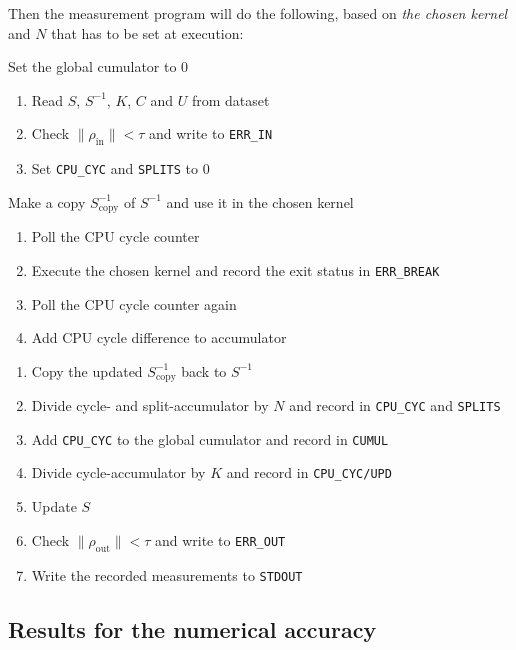 \documentclass[11pt]{article}
\numberwithin{figure}{section}
\numberwithin{table}{section}
\begin{document}
      Then the measurement program will do the following, based on \emph{the chosen kernel} and $N$ that has to be set at execution:\\
\begin{algorithm}[H]
Set the global cumulator to 0\;
 {
	\begin{enumerate}
		\item Read $S$, $S^{-1}$, $K$, $C$ and $U$ from dataset
		\item Check $\|\rho_\mathrm{in}\|<\tau$ and write to \texttt{ERR\_IN}
		\item Set \texttt{CPU\_CYC} and \texttt{SPLITS} to 0
	\end{enumerate}
	 {
		Make a copy $S_\mathrm{copy}^{-1}$ of $S^{-1}$ and use it in the chosen kernel\;
		 {
			\begin{enumerate}
				\item Poll the CPU cycle counter
				\item Execute the chosen kernel and record the exit status in \texttt{ERR\_BREAK}
				\item Poll the CPU cycle counter again
				\item Add CPU cycle difference to accumulator
			\end{enumerate}
		}
	}
	\begin{enumerate}
		\item Copy the updated $S_\mathrm{copy}^{-1}$ back to $S^{-1}$
		\item Divide cycle- and split-accumulator by $N$ and record in \texttt{CPU\_CYC} and \texttt{SPLITS}
		\item Add \texttt{CPU\_CYC} to the global cumulator and record in \texttt{CUMUL}
		\item Divide cycle-accumulator by $K$ and record in \texttt{CPU\_CYC/UPD}
		\item Update $S$
		\item Check $\|\rho_\mathrm{out}\|<\tau$ and write to \texttt{ERR\_OUT}
		\item Write the recorded measurements to \texttt{STDOUT}
	\end{enumerate}
}
\end{algorithm}
		
    \subsection{Results for the numerical accuracy}
    
\end{document}
